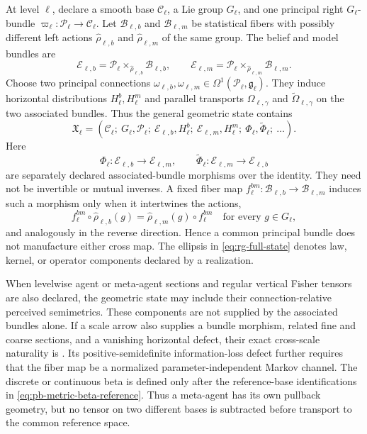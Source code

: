At level \(\ell\), declare a smooth base \(\mathcal C_\ell\), a Lie group
\(G_\ell\), and one principal right \(G_\ell\)-bundle
\(\varpi_\ell:\mathscr P_\ell\to\mathcal C_\ell\). Let
\(\mathcal B_{\ell,b}\) and \(\mathcal B_{\ell,m}\) be statistical fibers with
possibly different left actions
\(\widehat\rho_{\ell,b}\) and \(\widehat\rho_{\ell,m}\) of the same group. The
belief and model bundles are
\begin{equation}
\mathcal E_{\ell,b}
=\mathscr P_\ell\times_{\widehat\rho_{\ell,b}}\mathcal B_{\ell,b},
\qquad
\mathcal E_{\ell,m}
=\mathscr P_\ell\times_{\widehat\rho_{\ell,m}}\mathcal B_{\ell,m}.
\label{eq:rg-associated-bundles}
\end{equation}
Choose two principal connections
\(\omega_{\ell,b},\omega_{\ell,m}\in
\Omega^1(\mathscr P_\ell,\mathfrak g_\ell)\). They induce horizontal distributions
\(H^b_\ell,H^m_\ell\) and parallel transports
\(\Omega_{\ell,\gamma}\) and
\(\widetilde\Omega_{\ell,\gamma}\) on the two associated bundles. Thus the
general geometric state contains
\begin{equation}
\mathfrak X_\ell=
\left(
\mathcal C_\ell;\
G_\ell,\mathscr P_\ell;\
\mathcal E_{\ell,b},H^b_\ell;\
\mathcal E_{\ell,m},H^m_\ell;\
\Phi_\ell,\widetilde\Phi_\ell;\
\ldots
\right).
\label{eq:rg-full-state}
\end{equation}
Here
\[
\Phi_\ell:\mathcal E_{\ell,b}\to\mathcal E_{\ell,m},
\qquad
\widetilde\Phi_\ell:\mathcal E_{\ell,m}\to\mathcal E_{\ell,b}
\]
are separately declared associated-bundle morphisms over the identity. They
need not be invertible or mutual inverses. A fixed fiber map
\(f^{bm}_\ell:\mathcal B_{\ell,b}\to\mathcal B_{\ell,m}\) induces such a morphism
only when it intertwines the actions,
\begin{equation}
f^{bm}_\ell\circ\widehat\rho_{\ell,b}(g)
=\widehat\rho_{\ell,m}(g)\circ f^{bm}_\ell
\quad\text{for every }g\in G_\ell,
\label{eq:rg-cross-intertwiner}
\end{equation}
and analogously in the reverse direction. Hence a common principal bundle
does not manufacture either cross map. The ellipsis in
\eqref{eq:rg-full-state} denotes law, kernel, or operator components declared
by a realization. 

When levelwise agent or meta-agent sections and regular vertical Fisher
tensors are also declared, the geometric state may include their
connection-relative perceived semimetrics.  These components are not supplied
by the associated bundles alone.  If a scale arrow also supplies a bundle
morphism, related fine and coarse sections, and a vanishing horizontal
defect, their exact cross-scale naturality is
\Cref{cor:pb-meta-perceived-geometry}.  Its positive-semidefinite
information-loss defect further requires that the fiber map be a normalized
parameter-independent Markov channel.  The discrete or continuous beta is
defined only after the reference-base identifications in
\eqref{eq:pb-metric-beta-reference}.  Thus a meta-agent has its own pullback
geometry, but no tensor on two different bases is subtracted before transport
to the common reference space. \status{ESTABLISHED}

